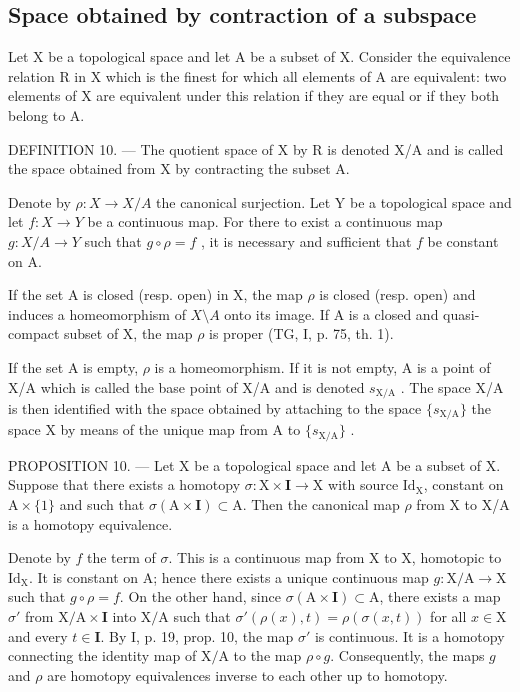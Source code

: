 \subsection{Space obtained by contraction of a subspace}

Let X be a topological space and let A be a subset of X. Consider the equivalence relation R in X which is the finest for which all elements of A are equivalent: two elements of X are equivalent under this relation if they are equal or if they both belong to A.

DEFINITION 10. --- The quotient space of X by R is denoted X/A and is called the space obtained from X by contracting the subset A.

Denote by \(\rho\colon X\to X/A\) the canonical surjection. Let Y be a topological space and let \(f\colon X\to Y\) be a continuous map. For there to exist a continuous map \(g\colon X/A\to Y\) such that \(g\circ\rho=f\) , it is necessary and sufficient that \(f\) be constant on A.

If the set A is closed (resp. open) in X, the map \(\rho\) is closed (resp. open) and induces a homeomorphism of \(X\setminus A\) onto its image. If A is a closed and quasi-compact subset of X, the map \(\rho\) is proper (TG, I, p. 75, th. 1).

If the set A is empty, \(\rho\) is a homeomorphism. If it is not empty, A is a point of X/A which is called the base point of X/A and is denoted \(s_{\mathrm{X / A}}\) . The space X/A is then identified with the space obtained by attaching to the space \(\{s_{\mathrm{X / A}}\}\) the space X by means of the unique map from A to \(\{s_{\mathrm{X / A}}\}\) .

PROPOSITION 10. --- Let X be a topological space and let A be a subset of X. Suppose that there exists a homotopy \(\sigma: \mathrm{X} \times \mathbf{I} \to \mathrm{X}\) with source \(\mathrm{Id}_{\mathrm{X}}\), constant on \(\mathrm{A} \times \{1\}\) and such that \(\sigma(\mathrm{A} \times \mathbf{I}) \subset \mathrm{A}\). Then the canonical map \(\rho\) from X to X/A is a homotopy equivalence.

Denote by \(f\) the term of \(\sigma\). This is a continuous map from X to X, homotopic to \(\mathrm{Id}_{\mathrm{X}}\). It is constant on A; hence there exists a unique continuous map \(g \colon \mathrm{X} / \mathrm{A} \to \mathrm{X}\) such that \(g \circ \rho = f\). On the other hand, since \(\sigma(\mathrm{A} \times \mathbf{I}) \subset \mathrm{A}\), there exists a map \(\sigma'\) from \(\mathrm{X} / \mathrm{A} \times \mathbf{I}\) into \(\mathrm{X} / \mathrm{A}\) such that \(\sigma'(\rho(x), t) = \rho(\sigma(x, t))\) for all \(x \in \mathrm{X}\) and every \(t \in \mathbf{I}\). By I, p. 19, prop. 10, the map \(\sigma'\) is continuous. It is a homotopy connecting the identity map of \(\mathrm{X} / \mathrm{A}\) to the map \(\rho \circ g\). Consequently, the maps \(g\) and \(\rho\) are homotopy equivalences inverse to each other up to homotopy.

